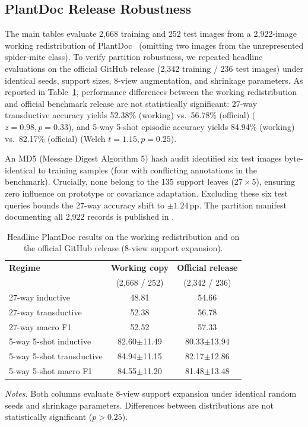 \subsection{PlantDoc Release Robustness}
\label{app:plantdoc_official}
The main tables evaluate 2{,}668 training and 252 test images from a 2{,}922-image working redistribution of PlantDoc~\cite{singh2020plantdoc} (omitting two images from the unrepresented spider-mite class). To verify partition robustness, we repeated headline evaluations on the official GitHub release (2{,}342 training / 236 test images) under identical seeds, support sizes, 8-view augmentation, and shrinkage parameters. As reported in Table~\ref{tab:plantdoc_official}, performance differences between the working redistribution and official benchmark release are not statistically significant: 27-way transductive accuracy yields 52.38\% (working) vs.\ 56.78\% (official) ($z=0.98, p=0.33$), and 5-way 5-shot episodic accuracy yields 84.94\% (working) vs.\ 82.17\% (official) (Welch $t=1.15, p=0.25$).

An MD5 (Message Digest Algorithm 5) hash audit identified six test images byte-identical to training samples (four with conflicting annotations in the benchmark). Crucially, none belong to the 135 support leaves ($27 \times 5$), ensuring zero influence on prototype or covariance adaptation. Excluding these six test queries bounds the 27-way accuracy shift to $\pm1.24$\,pp. The partition manifest documenting all 2{,}922 records is published in .

\begin{table}[htbp]
\caption{Headline PlantDoc results on the working redistribution and on the official GitHub release (8-view support expansion).}
\label{tab:plantdoc_official}
\centering
\footnotesize
\setlength{\tabcolsep}{4pt}
\begin{tabular*}{\columnwidth}{@{\extracolsep{\fill}}lcc}
\toprule
\textbf{Regime} & \textbf{Working copy} & \textbf{Official release} \\
 & (2{,}668 / 252) & (2{,}342 / 236) \\
\midrule
27-way inductive & 48.81 & 54.66 \\
27-way transductive & 52.38 & 56.78 \\
27-way macro F1 & 52.52 & 57.33 \\
5-way 5-shot inductive & 82.60$\pm$11.49 & 80.33$\pm$13.94 \\
5-way 5-shot transductive & 84.94$\pm$11.15 & 82.17$\pm$12.86 \\
5-way 5-shot macro F1 & 84.55$\pm$11.20 & 81.48$\pm$13.48 \\
\bottomrule
\end{tabular*}

\vspace{3pt}
\begin{minipage}{\columnwidth}
\footnotesize
\textit{Notes.} Both columns evaluate 8-view support expansion under identical random seeds and shrinkage parameters. Differences between distributions are not statistically significant ($p > 0.25$).
\end{minipage}
\end{table}

